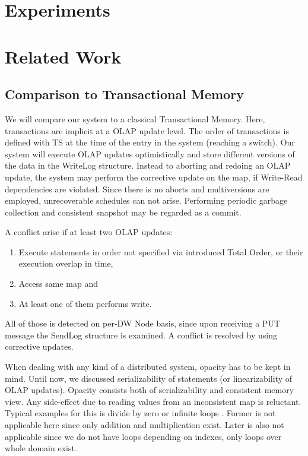 \documentclass{sig-semester}
\def\OLAP{OLAP\xspace}
\begin{document}
\section{Experiments}
\label{sec:Experiments}
\vspace{2mm}

\section{Related Work}
\label{sec:Related}
\vspace{2mm}

\subsection{Comparison to Transactional Memory}
We will compare our system to a classical Transactional Memory. Here, transactions are implicit at a \OLAP update level. The order of transactions is defined with TS at the time of the entry in the system (reaching a switch). Our system will execute \OLAP updates optimistically and store different versions of the data in the WriteLog structure. Instead to aborting and redoing an \OLAP update, the system may perform the corrective update on the map, if Write-Read dependencies are violated. Since there is no aborts and multiversions are employed, unrecoverable schedules can not arise. Performing periodic garbage collection and consistent snapshot may be regarded as a commit.

A conflict arise if at least two \OLAP updates:
\begin{enumerate}[(1)]
 \item Execute statements in order not specified via introduced Total Order, or their execution overlap in time, 
 \item Access same map and
 \item At least one of them performs write.
\end{enumerate}

All of those is detected on per-DW Node basis, since upon receiving a PUT message the SendLog structure is examined. A conflict is resolved by using corrective updates.

When dealing with any kind of a distributed system, opacity has to be kept in mind. Until now, we discussed serializability of statements (or linearizability of \OLAP updates). Opacity consists both of serializability and consistent memory view. Any side-effect due to reading values from an inconsistent map is reluctant. Typical examples for this is divide by zero or infinite loops \cite{Rachid08}. Former is not applicable here since only addition and multiplication exist. Later is also not applicable since we do not have loops depending on indexes, only loops over whole domain exist.
\end{document}
